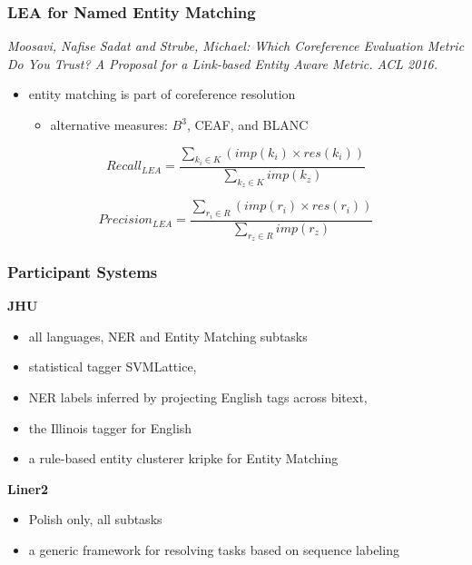 \documentclass{beamer}
\begin{document}
\begin{frame}
 \frametitle{LEA for Named Entity Matching}

\textit{Moosavi, Nafise Sadat  and  Strube, Michael: Which Coreference Evaluation Metric Do You Trust? A Proposal for a Link-based Entity Aware Metric. ACL 2016.}

\begin{itemize}
\item entity matching is part of coreference resolution

\begin{itemize}
\item alternative measures: $B^3$, CEAF, and BLANC
\end{itemize}

\end{itemize}

\begin{equation*}
	\mathit{\mathit{Recall}_{LEA}} = \frac{\sum_{k_{i} \in K} (\mathit{imp}(k_i) \times \mathit{res}(k_{i}))}
              {\sum_{k_{z} \in K} imp(k_{z})}
\end{equation*}

\begin{equation*}
	\mathit{\mathit{Precision}_{LEA}} = \frac{\sum_{r_{i} \in R} (\mathit{imp}(r_i) \times \mathit{res}(r_{i}))}
              {\sum_{r_{z} \in R} imp(r_{z})}
\end{equation*}

\end{frame}

\begin{frame}
 \frametitle{Participant Systems}

\textbf{JHU}
\begin{itemize}
\item all languages, NER and Entity Matching subtasks
\item statistical tagger SVMLattice, 
\item NER labels inferred by projecting English tags across bitext,
\item the Illinois tagger for English
\item a rule-based entity clusterer kripke for Entity Matching
\end{itemize}

\textbf{Liner2}
\begin{itemize}
\item Polish only, all subtasks
\item a generic framework for resolving tasks based on sequence labeling
\end{itemize}

\end{frame}
\end{document}
